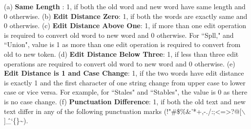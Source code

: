 \documentclass[letterpaper]{article}
\begin{document}
\begin{enumerate}
\begin{itemize}
%
(a) \textbf{Same Length} : 1, if both the old word and new word have same length and $0$ otherwise. 
(b) \textbf{Edit Distance Zero}:  1, if both the words are exactly same and $0$ otherwise. 
(c) \textbf{Edit Distance Above One}: 1, if more than one edit operation is required to convert old word to new word and $0$ otherwise. For ``Spll," and ``Union", value is 1 as more than one edit operation is required to convert from old to new token.
(d) \textbf{Edit Distance Below Three}: 1, if less than three edit operations are required to convert old word to new word and $0$ otherwise. 
(e) \textbf{Edit Distance is 1 and Case Change}: 1, if the two words have edit distance is exactly 1 and the first character of one string change from upper case to lower case or vice versa. For example, for ``Stales" and ``Stables", the value is 0 as there is no case change.
(f) \textbf{Punctuation Difference}: 1, if both the old text and new text differ in any of the following punctuation marks (!"\#\$\%\&'*+,-./:;\textless=\textgreater?@[$\backslash$]\^\_`\{\textbar\}\textasciitilde).



\end{itemize}
\end{enumerate}
\end{document}
